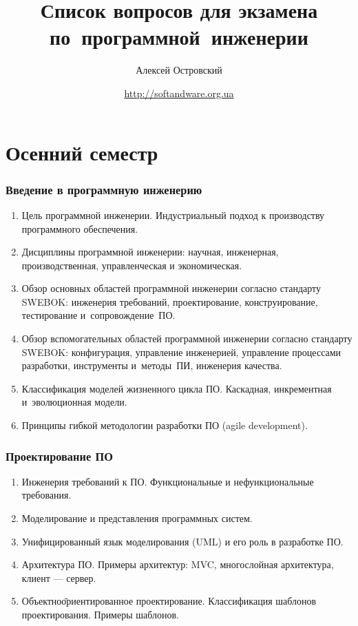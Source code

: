 \documentclass[a4paper,10pt]{article}
\title{Список вопросов для экзамена по~программной~инженерии}
\author{Алексей Островский}
\date{\url{http://softandware.org.ua}}
\newcounter{globalenum}
\newenvironment{genumerate}{%
	\begin{enumerate}%
	\afterlabel.%
	\setcounter{enumi}{\theglobalenum}%
}{%
	\setcounter{globalenum}{\theenumi}%
	\end{enumerate}%
}
\begin{document}
\maketitle

\section{Осенний семестр}

\subsubsection*{Введение в программную инженерию}

\begin{genumerate}
	\item
	Цель программной инженерии. Индустриальный подход к производству 
	программного обеспечения.

	\item
	Дисциплины программной инженерии: научная, инженерная, производственная, 
	управленческая и экономическая.

	\item
	Обзор основных областей программной инженерии согласно стандарту SWEBOK: 
	инженерия требований, проектирование, конструирование, тестирование 
	и~сопровождение~ПО.

	\item
	Обзор вспомогательных областей программной инженерии согласно стандарту SWEBOK: 
	конфигурация, управление инженерией, управление процессами разработки, 
	инструменты и~методы~ПИ, инженерия качества.

	\item
	Классификация моделей жизненного цикла ПО. Каскадная, инкрементная 
	и~эволюционная модели.

	\item
	Принципы гибкой методологии разработки ПО (agile development).
\end{genumerate}

\subsubsection*{Проектирование ПО}

\begin{genumerate}
	\item
	Инженерия требований к ПО. Функциональные и нефункциональные требования.

	\item
	Моделирование и представления программных систем.

	\item
	Унифицированный язык моделирования (UML) и его роль в разработке ПО.

	\item
	Архитектура ПО. Примеры архитектур: MVC, многослойная архитектура, клиент — сервер.

	\item
	Объектно\=ориентированное проектирование. Классификация шаблонов проектирования. Примеры шаблонов.
\end{genumerate}
\end{document}
